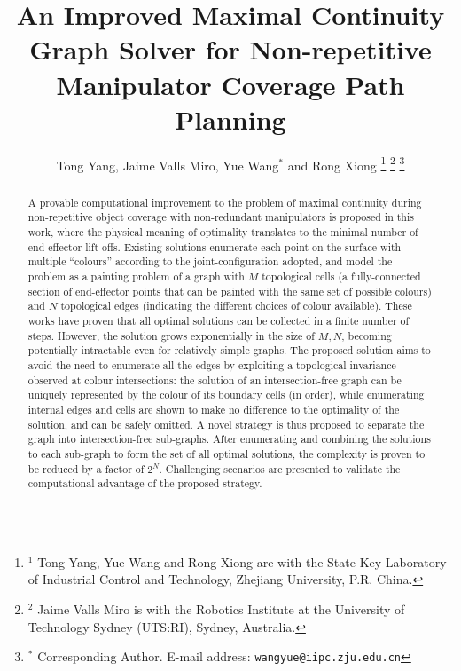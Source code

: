 \documentclass[journal]{IEEEtran}
\begin{document}
\title{An Improved Maximal Continuity Graph Solver for Non-repetitive Manipulator Coverage Path Planning}

\author{Tong Yang, Jaime Valls Miro, Yue Wang$^*$ and Rong Xiong
\thanks{$^1$ Tong Yang, Yue Wang and Rong Xiong are with the State Key 
Laboratory of Industrial Control and Technology, Zhejiang University, P.R. China. 
}
\thanks{$^2$ Jaime Valls Miro is with the Robotics Institute at the University of Technology Sydney (UTS:RI), Sydney, Australia.}
\thanks{$^*$ Corresponding Author. \newline \indent
E-mail address: {\tt\small wangyue@iipc.zju.edu.cn}}
}

\maketitle

\begin{abstract}
A provable computational improvement to the problem of maximal continuity during non-repetitive object coverage with non-redundant manipulators is proposed in this work, where the physical meaning of optimality translates to the minimal number of end-effector lift-offs. Existing solutions enumerate each point on the surface with multiple ``colours'' according to the joint-configuration adopted, and model the problem as a painting problem of a graph with $M$ topological cells (a fully-connected section of end-effector points that can be painted with the same set of possible colours) and $N$ topological edges
(indicating the different choices of colour available). 
These works have proven that all optimal solutions can be collected in a finite number of steps. However, the solution grows exponentially in the size of $M, N$, becoming potentially intractable even for relatively simple graphs.
The proposed solution aims to avoid the need to enumerate all 
the edges by exploiting a topological invariance observed at colour intersections: 
the solution of an intersection-free graph can be uniquely represented by the colour of its boundary cells (in order), while enumerating internal edges and cells 
are shown to make no difference to the optimality of the solution, and can be safely omitted. 
A novel strategy is thus proposed to separate the graph into intersection-free sub-graphs.  
After enumerating and combining the solutions to each sub-graph to form the set of all optimal solutions, 
the complexity is proven to be reduced by a factor of $2^N$. Challenging scenarios are presented to validate the computational advantage of the proposed strategy.
\end{abstract}
\end{document}
